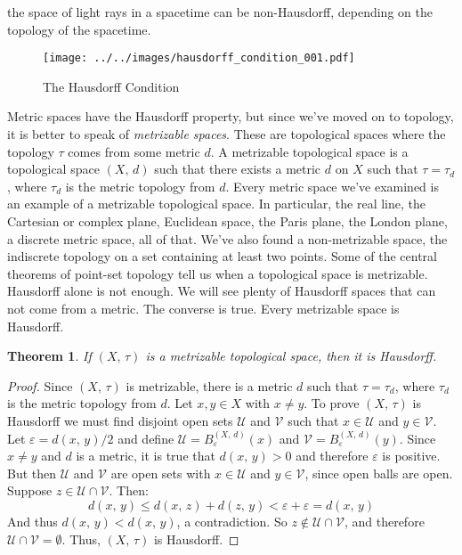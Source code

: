 \documentclass{article}
\theoremstyle{plain}
\newtheorem{theorem}{Theorem}[section]
\theoremstyle{normal}
\newenvironment{definition}{%
    \pushQED{\qed}\renewcommand{\qedsymbol}{$\blacksquare$}\definitionx%
}{%
    \popQED\enddefinitionx%
}
\begin{document}
    the space of light rays in a spacetime can be non-Hausdorff, depending on
    the topology of the spacetime.
    \par\hfill\par
    \begin{figure}
        \centering
        \texttt{[image: ../../images/hausdorff\_condition\_001.pdf]}
        \caption{The Hausdorff Condition}
        \label{fig:hausdorff_condition_001}
    \end{figure}
    Metric spaces have the Hausdorff property, but since we've moved on to
    topology, it is better to speak of \textit{metrizable spaces}. These are
    topological spaces where the topology $\tau$ comes from some metric $d$.
    \begin{definition}[\textbf{Metrizable Topological Space}]
        A metrizable topological space is a topological space $(X,\,d)$ such
        that there exists a metric $d$ on $X$ such that $\tau=\tau_{d}$,
        where $\tau_{d}$ is the metric topology from $d$.
    \end{definition}
    Every metric space we've examined is an example of a metrizable topological
    space. In particular, the real line, the Cartesian or complex plane,
    Euclidean space, the Paris plane, the London plane, a discrete metric space,
    all of that. We've also found a non-metrizable space, the indiscrete
    topology on a set containing at least two points. Some of the central
    theorems of point-set topology tell us when a topological space is
    metrizable. Hausdorff alone is not enough. We will see plenty of Hausdorff
    spaces that can not come from a metric. The converse is true. Every
    metrizable space is Hausdorff.
    \begin{theorem}
        If $(X,\,\tau)$ is a metrizable topological space, then it is
        Hausdorff.
    \end{theorem}
    \begin{proof}
        Since $(X,\,\tau)$ is metrizable, there is a metric $d$ such that
        $\tau=\tau_{d}$, where $\tau_{d}$ is the metric topology from $d$.
        Let $x,y\in{X}$ with $x\ne{y}$. To prove $(X,\,\tau)$ is Hausdorff we
        must find disjoint open sets $\mathcal{U}$ and $\mathcal{V}$ such that
        $x\in\mathcal{U}$ and $y\in\mathcal{V}$. Let
        $\varepsilon=d(x,\,y)/2$ and define
        $\mathcal{U}=B_{\varepsilon}^{(X,\,d)}(x)$ and
        $\mathcal{V}=B_{\varepsilon}^{(X,\,d)}(y)$. Since $x\ne{y}$ and $d$
        is a metric, it is true that $d(x,\,y)>0$ and therefore $\varepsilon$
        is positive. But then $\mathcal{U}$ and $\mathcal{V}$ are open sets
        with $x\in\mathcal{U}$ and $y\in\mathcal{V}$, since open balls are open.
        Suppose $z\in\mathcal{U}\cap\mathcal{V}$. Then:
        \begin{equation}
            d(x,\,y)
            \leq{d}(x,\,z)+d(z,\,y)
            <\varepsilon+\varepsilon
            =d(x,\,y)
        \end{equation}
        And thus $d(x,\,y)<d(x,\,y)$, a contradiction. So
        $z\notin\mathcal{U}\cap\mathcal{V}$, and therefore
        $\mathcal{U}\cap\mathcal{V}=\emptyset$. Thus, $(X,\,\tau)$ is
        Hausdorff.
    \end{proof}
\end{document}
